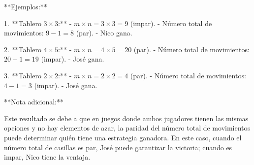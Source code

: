 \documentclass[11pt]{scrartcl}
\begin{document}
\begin{problem}
\begin{hint}
\begin{solu}
**Ejemplos:**

1. **Tablero $3 \times 3$:**
   - $m \times n = 3 \times 3 = 9$ (impar).
   - Número total de movimientos: $9 - 1 = 8$ (par).
   - Nico gana.

2. **Tablero $4 \times 5$:**
   - $m \times n = 4 \times 5 = 20$ (par).
   - Número total de movimientos: $20 - 1 = 19$ (impar).
   - José gana.

3. **Tablero $2 \times 2$:**
   - $m \times n = 2 \times 2 = 4$ (par).
   - Número total de movimientos: $4 - 1 = 3$ (impar).
   - José gana.

**Nota adicional:**

Este resultado se debe a que en juegos donde ambos jugadores tienen las mismas opciones y no hay elementos de azar, la paridad del número total de movimientos puede determinar quién tiene una estrategia ganadora. En este caso, cuando el número total de casillas es par, José puede garantizar la victoria; cuando es impar, Nico tiene la ventaja.
\end{solu}
\end{hint}
\end{problem}
\end{document}
